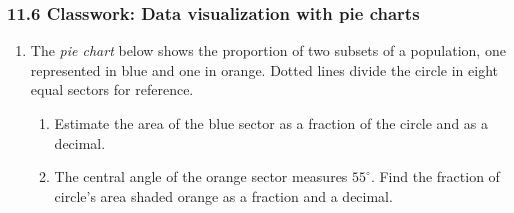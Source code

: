 

\fancyhead[LE]{\thepage}



\subsubsection*{11.6 Classwork: Data visualization with pie charts}
\begin{enumerate}
\item The \emph{pie chart} below shows the proportion of two subsets of a population, one represented in blue and one in orange. Dotted lines divide the circle in eight equal sectors for reference.
  \begin{multicols}{2}
  \raggedcolumns
  \begin{enumerate}[itemsep=1.5cm]
    \item Estimate the area of the blue sector as a fraction of the circle and as a decimal.
    \item The central angle of the orange sector measures $55^\circ$. Find the fraction of circle's area shaded orange as a fraction and a decimal.
  \end{enumerate}
  \end{multicols}


\end{enumerate}
